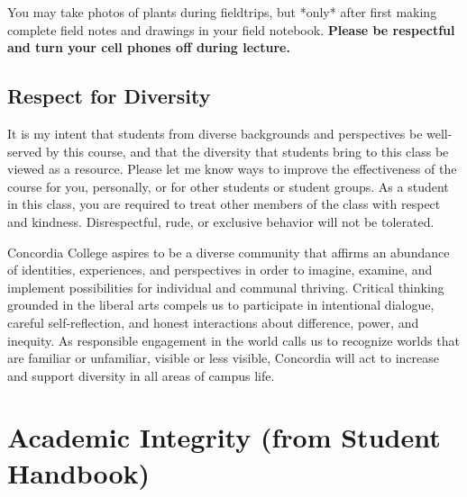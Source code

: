 \documentclass{tufte-handout}
\begin{document}
\begin{fullwidth}
You may take photos of plants during fieldtrips, but *only* after first making complete field notes and drawings in your field notebook. \textbf{Please be respectful and turn your cell phones off during lecture.}

\subsection{Respect for Diversity}

It is my intent that students from diverse backgrounds and perspectives be well-served by this course, and that the diversity that students bring to this class be viewed as a resource. Please let me know ways to improve the effectiveness of the course for you, personally, or for other students or student groups. As a student in this class, you are required to treat other members of the class with respect and kindness. Disrespectful, rude, or exclusive behavior will not be tolerated.

 Concordia College aspires to be a diverse community that affirms an abundance of identities, experiences, and perspectives in order to imagine, examine, and implement possibilities for individual and communal thriving. Critical thinking grounded in the liberal arts compels us to participate in intentional dialogue, careful self-reflection, and honest interactions about difference, power, and inequity. As responsible engagement in the world calls us to recognize worlds that are familiar or unfamiliar, visible or less visible, Concordia will act to increase and support diversity in all areas of campus life.

\end{fullwidth}

\section{Academic Integrity (from Student Handbook)}


\end{document}
